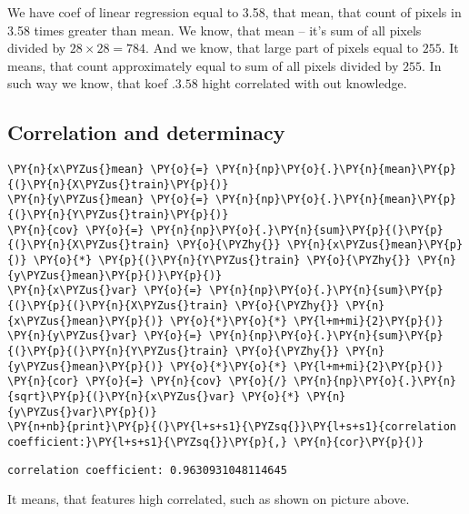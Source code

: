 We have coef of linear regression equal to 3.58, that mean, that count of pixels in 3.58 times greater than mean. We know, that mean -- it's sum of all pixels divided by $28 \times 28 = 784$. And we know, that large part of pixels equal to $255$. It means, that count approximately equal to sum of all pixels divided by $255$. In such way we know, that koef $.3.58$ hight correlated with out knowledge.

\subsection*{Correlation and determinacy}
        
    \begin{tcolorbox}[breakable, size=fbox, boxrule=1pt, pad at break*=1mm,colback=cellbackground, colframe=cellborder]
\begin{Verbatim}[commandchars=\\\{\}]
\PY{n}{x\PYZus{}mean} \PY{o}{=} \PY{n}{np}\PY{o}{.}\PY{n}{mean}\PY{p}{(}\PY{n}{X\PYZus{}train}\PY{p}{)}
\PY{n}{y\PYZus{}mean} \PY{o}{=} \PY{n}{np}\PY{o}{.}\PY{n}{mean}\PY{p}{(}\PY{n}{Y\PYZus{}train}\PY{p}{)}
\PY{n}{cov} \PY{o}{=} \PY{n}{np}\PY{o}{.}\PY{n}{sum}\PY{p}{(}\PY{p}{(}\PY{n}{X\PYZus{}train} \PY{o}{\PYZhy{}} \PY{n}{x\PYZus{}mean}\PY{p}{)} \PY{o}{*} \PY{p}{(}\PY{n}{Y\PYZus{}train} \PY{o}{\PYZhy{}} \PY{n}{y\PYZus{}mean}\PY{p}{)}\PY{p}{)}
\PY{n}{x\PYZus{}var} \PY{o}{=} \PY{n}{np}\PY{o}{.}\PY{n}{sum}\PY{p}{(}\PY{p}{(}\PY{n}{X\PYZus{}train} \PY{o}{\PYZhy{}} \PY{n}{x\PYZus{}mean}\PY{p}{)} \PY{o}{*}\PY{o}{*} \PY{l+m+mi}{2}\PY{p}{)}
\PY{n}{y\PYZus{}var} \PY{o}{=} \PY{n}{np}\PY{o}{.}\PY{n}{sum}\PY{p}{(}\PY{p}{(}\PY{n}{Y\PYZus{}train} \PY{o}{\PYZhy{}} \PY{n}{y\PYZus{}mean}\PY{p}{)} \PY{o}{*}\PY{o}{*} \PY{l+m+mi}{2}\PY{p}{)}
\PY{n}{cor} \PY{o}{=} \PY{n}{cov} \PY{o}{/} \PY{n}{np}\PY{o}{.}\PY{n}{sqrt}\PY{p}{(}\PY{n}{x\PYZus{}var} \PY{o}{*} \PY{n}{y\PYZus{}var}\PY{p}{)}
\PY{n+nb}{print}\PY{p}{(}\PY{l+s+s1}{\PYZsq{}}\PY{l+s+s1}{correlation coefficient:}\PY{l+s+s1}{\PYZsq{}}\PY{p}{,} \PY{n}{cor}\PY{p}{)}
\end{Verbatim}
\end{tcolorbox}

    \begin{Verbatim}[commandchars=\\\{\}]
correlation coefficient: 0.9630931048114645
    \end{Verbatim}

It means, that features high correlated, such as shown on picture above.

